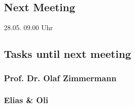 \hypertarget{next-meeting}{%
\subsection*{Next Meeting}\label{next-meeting}}

28.05. 09.00 Uhr

\hypertarget{tasks-until-next-meeting}{%
\subsection*{Tasks until next meeting}\label{tasks-until-next-meeting}}

\hypertarget{prof-dr-olaf-zimmermann}{%
\subsubsection*{Prof. Dr. Olaf
Zimmermann}\label{prof-dr-olaf-zimmermann}}

\hypertarget{elias--oli}{%
\subsubsection*{Elias \& Oli}\label{elias--oli}}